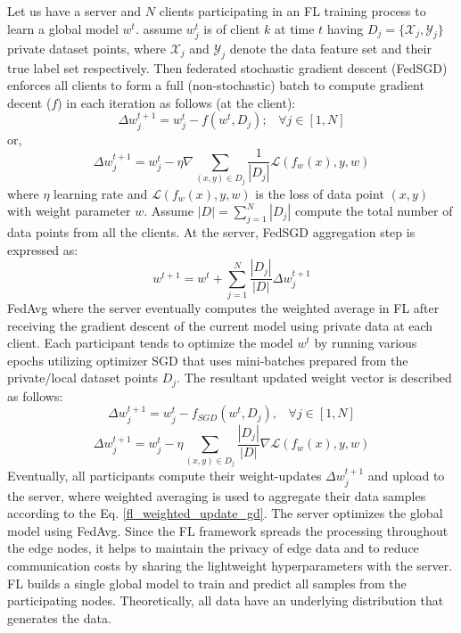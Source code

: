 \documentclass[journal]{IEEEtran}
\begin{document}
Let us have a server and $N$ clients participating in an FL training process to learn a global model $w^t$. assume $w^t_j$ is of client $k$ at time $t$ having $D_j = \{\mathcal{X}_j, \mathcal{Y}_j\}$ private dataset points, where $\mathcal{X}_j$ and $\mathcal{Y}_j$ denote the data feature set and their true label set respectively. Then federated stochastic gradient descent (FedSGD) enforces all clients to form a full (non-stochastic) batch to compute gradient decent ($f$) in each iteration as follows (at the client):   
\begin{equation}
\label{fl_weighted_update_gd}
\Delta w^{t+1}_j = w^{t}_j - f(w^{t}, D_j); \;\;\; \forall{j} \in [1,N] 
\end{equation}
or,
\begin{equation}
\label{fl_weighted_update_gd2}
\Delta w^{t+1}_j = w^{t}_j - \eta \nabla \sum_{(x,y)\in D_j} \frac{1}{|D_j|} \mathcal{L}(f_w(x),y,w) 
\end{equation}
where $\eta$ learning rate and $\mathcal{L}(f_w(x),y,w)$ is the loss of data point $(x,y)$ with weight parameter $w$. Assume $|D|=\sum_{j=1}^{N} |D_j|$ compute the total number of data points from all the clients.  At the server, FedSGD aggregation step is expressed as: 
\begin{equation}
\label{fl_server_aggregation}
w^{t+1} = w^{t} + \sum_{j=1}^{N} \dfrac{|D_j|}{|D|} \Delta w^{t+1}_j 
\end{equation}
FedAvg where the server eventually computes the weighted average in FL after receiving the gradient descent of the current model using private data at each client. Each participant tends to optimize
the model $w^t$ by running various epochs utilizing optimizer SGD that uses mini-batches prepared from the private/local dataset points $D_j$. The resultant updated weight vector is described as follows:
\begin{equation}
\label{fl_weighted_update_sgd}
\Delta w_j^{t+1} = w_j^{t}  - f_{SGD}(w^{t}, D_j), \;\;\; \forall{j} \in [1,N]
\end{equation}
\begin{equation}
\label{fl_weighted_update_gd2}
\Delta w^{t+1}_j = w^{t}_j - \eta \sum_{(x,y)\in D_j} \dfrac{|D_j|}{|D|}  \nabla \mathcal{L}(f_w(x),y,w)
\end{equation}
Eventually, all participants compute their weight-updates $\Delta w^{t+1}_j$ and upload to the server, where weighted averaging is used to aggregate their data samples according to the Eq. \ref{fl_weighted_update_gd}. The server optimizes the global model using FedAvg.
Since the FL framework spreads the processing throughout the edge nodes, it helps to maintain the privacy of edge data and to reduce communication costs by sharing the lightweight hyperparameters with the server. FL builds a single global model to train and predict all samples from the participating nodes. Theoretically, all data have an underlying distribution that generates the data. 
\end{document}
